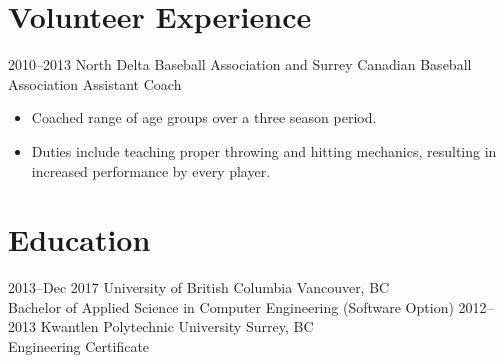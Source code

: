 \documentclass[]{friggeri-cv} %
\begin{document}



\section{Volunteer Experience}

\begin{entrylist}

\entry
{2010--2013}
{North Delta Baseball Association and Surrey Canadian Baseball Association {\normalfont Assistant Coach}}
{
\begin{itemize}
\item Coached range of age groups over a three season period.
\item Duties include teaching proper throwing and hitting mechanics, resulting
  in increased performance by every player.
\end{itemize}
}
\end{entrylist}


\section{Education}

\begin{entrylist}
\entry
{2013--Dec 2017}
{University of British Columbia {\normalfont Vancouver, BC}}
{\\Bachelor of Applied Science in Computer Engineering (Software Option)}
\entry
{2012--2013}
  {Kwantlen Polytechnic University {\normalfont Surrey, BC}} %
{\\Engineering Certificate}
\end{entrylist}


\end{document}
